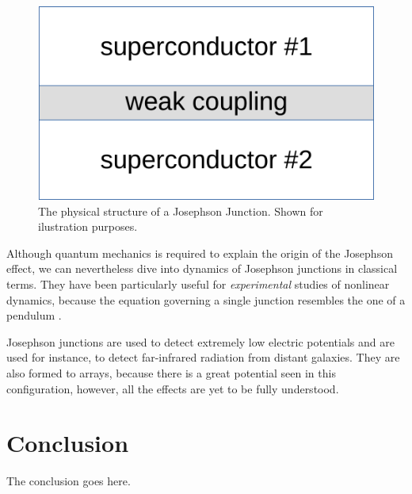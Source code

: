 \documentclass[journal]{IEEEtran}
\begin{document}
\begin{figure}[ht!]
	\centering
	\includegraphics[width=.4\linewidth]{jjunc}
	\caption{The physical structure of a Josephson Junction. Shown for ilustration purposes.}
	\label{f:jjunc}
\end{figure}

Although quantum mechanics is required to explain the origin of the Josephson effect, we can nevertheless dive into dynamics of Josephson junctions in classical terms. They have been particularly useful for \textit{experimental} studies of nonlinear dynamics, because the equation governing a single junction resembles the one of a pendulum \cite{strogatz1994nonlinear}.

Josephson junctions are used to detect extremely low electric potentials and are used for instance, to detect far-infrared radiation from distant galaxies. They are also formed to arrays, because there is a great potential seen in this configuration, however, all the effects are yet to be fully understood.

\section{Conclusion}
The conclusion goes here.



%
\end{document}
